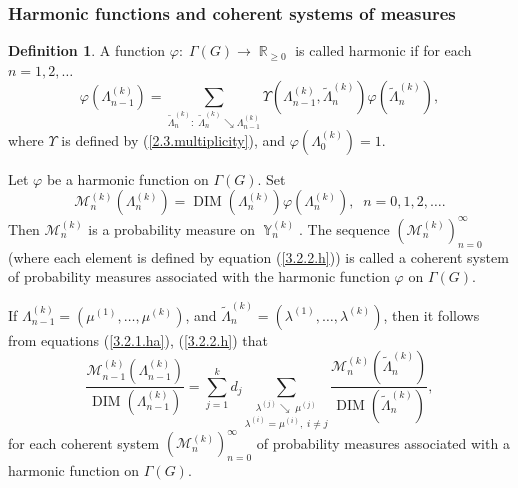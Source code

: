 \documentclass[12pt]{amsart}
\theoremstyle{definition}
\newtheorem{defn}[thm]{Definition}
\numberwithin{equation}{section}
\DeclareMathOperator{\R}{\mathbb{R}}
\DeclareMathOperator{\Y}{\mathbb{Y}}
\DeclareMathOperator{\DIM}{DIM}
\newcommand{\tLambda}{\widetilde{\Lambda}}
\begin{document}
\subsubsection{Harmonic functions and coherent systems of measures}
\begin{defn}\label{DEFINITIONHARMONICFUNCTIONG} A function  $\varphi:\; \Gamma\left(G\right)\longrightarrow\R_{\geq 0}$ is called harmonic if for each $n=1,2,\ldots$
\begin{equation}\label{3.2.1.ha}
\varphi\left(\Lambda_{n-1}^{(k)}\right)
=\sum\limits_{\tLambda_n^{(k)}:\;\tLambda_n^{(k)}\searrow\Lambda_{n-1}^{(k)}}
\Upsilon\left(\Lambda_{n-1}^{(k)},\tLambda_n^{(k)}\right)\varphi\left(\tLambda_n^{(k)}\right),
\end{equation}
where $\Upsilon$ is defined by (\ref{2.3.multiplicity}), and $\varphi\left(\Lambda_0^{(k)}\right)=1$.
\end{defn}
Let $\varphi $ be a harmonic function on $\Gamma\left(G\right)$. Set
\begin{equation}\label{3.2.2.h}
\mathcal{M}_n^{(k)}\left(\Lambda_n^{(k)}\right)=\DIM\left(\Lambda_n^{(k)}\right)
\varphi\left(\Lambda_n^{(k)}\right),\;\; n=0,1,2,\ldots .
\end{equation}
Then $\mathcal{M}_n^{(k)}$ is a probability measure on $\Y_n^{(k)}$. The sequence
$\left(\mathcal{M}_n^{(k)}\right)_{n=0}^{\infty}$
(where each element is defined by equation (\ref{3.2.2.h})) is called a coherent system of probability measures associated with the harmonic function $\varphi$ on $\Gamma\left(G\right)$.


If $\Lambda_{n-1}^{(k)}=\left(\mu^{(1)},\ldots,\mu^{(k)}\right)$, and
$\tLambda_n^{(k)}=\left(\lambda^{(1)},\ldots,\lambda^{(k)}\right)$, then it follows from equations (\ref{3.2.1.ha}), (\ref{3.2.2.h}) that
\begin{equation}\label{3.3.harmonic}
\frac{\mathcal{M}_{n-1}^{(k)}\left(\Lambda_{n-1}^{(k)}\right)}{\DIM\left(\Lambda_{n-1}^{(k)}\right)}
=\sum\limits_{j=1}^{k}d_j\underset{\lambda^{(i)}=\mu^{(i)},\; i\neq j}{\sum\limits_{\lambda^{(j)}\searrow\;\mu^{(j)}}}
\frac{\mathcal{M}_{n}^{(k)}\left(\tLambda_{n}^{(k)}\right)}{\DIM\left(\tLambda_{n}^{(k)}\right)},
\end{equation}
for each coherent system $\left(\mathcal{M}_n^{(k)}\right)_{n=0}^{\infty}$ of probability measures associated with a harmonic function on $\Gamma\left(G\right)$.
\end{document}
